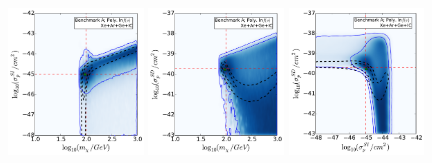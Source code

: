 \begin{figure}[!ht]
  \centering
  \includegraphics[width=0.32\textwidth]{NT/BenchmarkA_poly-mx_sigsi.pdf}
  \includegraphics[width=0.32\textwidth]{NT/BenchmarkA_poly-mx_sigsd.pdf}
  \includegraphics[width=0.32\textwidth]{NT/BenchmarkA_poly-sigsi_sigsd.pdf}


\end{figure}
